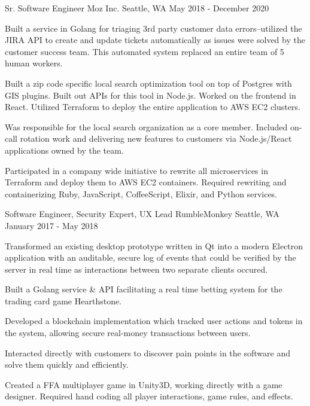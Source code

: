 \begin{cventries}
  \cventry
    {Sr. Software Engineer} %
    {Moz Inc.} %
    {Seattle, WA} %
    {May 2018 - December 2020} %
    {
      \begin{cvitems} %
        \item {Built a service in Golang for triaging 3rd party customer data errors--utilized the JIRA API to create and update tickets automatically as issues were solved by the customer success team. This automated system replaced an entire team of 5 human workers.}
        \item {Built a zip code specific local search optimization tool on top of Postgres with GIS plugins. Built out APIs for this tool in Node.js. Worked on the frontend in React. Utilized Terraform to deploy the entire application to AWS EC2 clusters.}
        \item {Was responsible for the local search organization as a core member. Included on-call rotation work and delivering new features to customers via Node.js/React applications owned by the team.}
        \item {Participated in a company wide initiative to rewrite all microservices in Terraform and deploy them to AWS EC2 containers. Required rewriting and containerizing Ruby, JavaScript, CoffeeScript, Elixir, and Python services.}
      \end{cvitems}
    }

  \cventry
    {Software Engineer, Security Expert, UX Lead} %
    {RumbleMonkey} %
    {Seattle, WA} %
    {January 2017 - May 2018} %
    {
      \begin{cvitems} %
        \item {Transformed an existing desktop prototype written in Qt into a modern Electron application with an auditable, secure log of events that could be verified by the server in real time as interactions between two separate clients occured.}
        \item {Built a Golang service \& API facilitating a real time betting system for the trading card game Hearthstone.}
        \item {Developed a blockchain implementation which tracked user actions and tokens in the system, allowing secure real-money transactions between users.}
        \item {Interacted directly with customers to discover pain points in the software and solve them quickly and efficiently.}
        \item {Created a FFA multiplayer game in Unity3D, working directly with a game designer. Required hand coding all player interactions, game rules, and effects.}
      \end{cvitems}
    }


\end{cventries}
